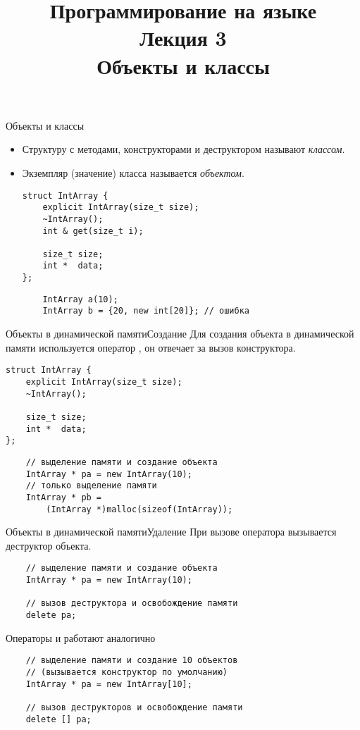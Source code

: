 \documentclass{beamer}
\title{{\bf Программирование на языке \langcpp\protect\\Лекция
3\protect\vspace{1em}\\}Объекты и классы}
\begin{document}
\begin{frame} 
  \titlepage
\end{frame}

\begin{frame}[fragile]{Объекты и классы}
    \small
    \begin{itemize}
        \item Структуру с методами, конструкторами и деструктором
            называют {\em классом}.
        \item Экземпляр (значение) класса называется {\em объектом}.
\begin{lstlisting}
struct IntArray {
    explicit IntArray(size_t size);
    ~IntArray(); 
    int & get(size_t i);

    size_t size;
    int *  data;
};
\end{lstlisting}
\begin{lstlisting}
    IntArray a(10);
    IntArray b = {20, new int[20]}; // ошибка
\end{lstlisting}
    \end{itemize}
\end{frame}

\begin{frame}[fragile]{Объекты в динамической памяти}{Создание}
Для создания объекта в динамической памяти используется оператор ,
он отвечает за вызов конструктора.
\begin{lstlisting}
struct IntArray {
    explicit IntArray(size_t size);
    ~IntArray(); 

    size_t size;
    int *  data;
};
\end{lstlisting}
\begin{lstlisting}
    // выделение памяти и создание объекта
    IntArray * pa = new IntArray(10);
    // только выделение памяти
    IntArray * pb = 
        (IntArray *)malloc(sizeof(IntArray));
\end{lstlisting}
\end{frame}

\begin{frame}[fragile]{Объекты в динамической памяти}{Удаление}
    При вызове оператора  вызывается
    деструктор объекта.
\begin{lstlisting}
    // выделение памяти и создание объекта
    IntArray * pa = new IntArray(10);

    // вызов деструктора и освобождение памяти
    delete pa;
\end{lstlisting}
    Операторы  и  работают аналогично
\begin{lstlisting}
    // выделение памяти и создание 10 объектов
    // (вызывается конструктор по умолчанию)
    IntArray * pa = new IntArray[10];

    // вызов деструкторов и освобождение памяти
    delete [] pa;
\end{lstlisting}
\end{frame}
\end{document}
